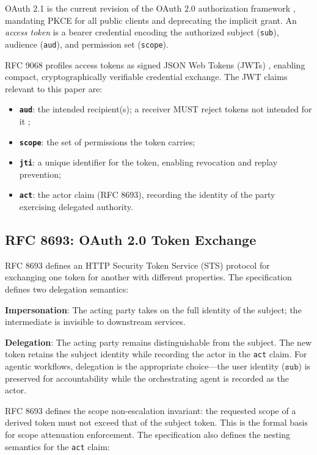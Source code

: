 \documentclass[journal]{IEEEtran}
\begin{document}
OAuth 2.1 \cite{oauth21} is the current revision of the OAuth 2.0 authorization
framework \cite{rfc6749}, mandating PKCE for all public clients and deprecating
the implicit grant. An \textit{access token} is a bearer credential encoding the
authorized subject (\texttt{sub}), audience (\texttt{aud}), and permission set
(\texttt{scope}).

RFC 9068 \cite{rfc9068} profiles access tokens as signed JSON Web Tokens
(JWTs) \cite{rfc7519}, enabling compact, cryptographically verifiable
credential exchange. The JWT claims relevant to this paper are:
\begin{itemize}
  \item \textbf{\texttt{aud}}: the intended recipient(s); a receiver MUST reject
        tokens not intended for it \cite{rfc9068};
  \item \textbf{\texttt{scope}}: the set of permissions the token carries;
  \item \textbf{\texttt{jti}}: a unique identifier for the token, enabling
        revocation and replay prevention;
  \item \textbf{\texttt{act}}: the actor claim (RFC 8693), recording the identity
        of the party exercising delegated authority.
\end{itemize}

\subsection{RFC 8693: OAuth 2.0 Token Exchange}

RFC 8693 \cite{rfc8693} defines an HTTP Security Token Service (STS) protocol
for exchanging one token for another with different properties. The specification
defines two delegation semantics:

\textbf{Impersonation}: The acting party takes on the full identity of the
subject; the intermediate is invisible to downstream services.

\textbf{Delegation}: The acting party remains distinguishable from the subject.
The new token retains the subject identity while recording the actor in the
\texttt{act} claim. For agentic workflows, delegation is the appropriate
choice---the user identity ($\texttt{sub}$) is preserved for accountability while
the orchestrating agent is recorded as the actor.

RFC 8693 defines the scope non-escalation invariant: the requested scope of a
derived token must not exceed that of the subject token. This is the formal
basis for scope attenuation enforcement. The specification also defines the
nesting semantics for the \texttt{act} claim:
\end{document}
